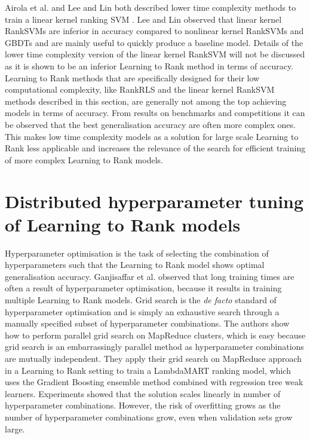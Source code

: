 Airola et al. \cite{Airola2011} and Lee and Lin \cite{Lee2014} both described lower time complexity methods to train a linear kernel ranking \ac{SVM} \cite{Herbrich1999, Joachims2002}. Lee and Lin \cite{Lee2014} observed that linear kernel Rank\ac{SVM}s are inferior in accuracy compared to nonlinear kernel Rank\ac{SVM}s and \ac{GBDT}s and are mainly useful to quickly produce a baseline model. Details of the lower time complexity version of the linear kernel Rank\ac{SVM} will not be discussed as it is shown to be an inferior Learning to Rank method in terms of accuracy.\\

Learning to Rank methods that are specifically designed for their low computational complexity, like RankRLS and the linear kernel Rank\ac{SVM} methods described in this section, are generally not among the top achieving models in terms of accuracy. From results on benchmarks and competitions it can be observed that the best generalisation accuracy are often more complex ones. This makes low time complexity models as a solution for large scale Learning to Rank less applicable and increases the relevance of the search for efficient training of more complex Learning to Rank models.\\ 

\section{Distributed hyperparameter tuning of Learning to Rank models}
Hyperparameter optimisation is the task of selecting the combination of hyperparameters such that the Learning to Rank model shows optimal generalisation accuracy. Ganjisaffar et al. \cite{Ganjisaffar2011, Ganjisaffar2011b} observed that long training times are often a result of hyperparameter optimisation, because it results in training multiple Learning to Rank models. Grid search is the \emph{de facto} standard of hyperparameter optimisation and is simply an exhaustive search through a manually specified subset of hyperparameter combinations. The authors show how to perform parallel grid search on MapReduce clusters, which is easy because grid search is an embarrassingly parallel method as hyperparameter combinations are mutually independent. They apply their grid search on MapReduce approach in a Learning to Rank setting to train a LambdaMART \cite{Wu2008} ranking model, which uses the Gradient Boosting \cite{Friedman2002} ensemble method combined with regression tree weak learners. Experiments showed that the solution scales linearly in number of hyperparameter combinations. However, the risk of overfitting grows as the number of hyperparameter combinations grow, even when validation sets grow large.\\

